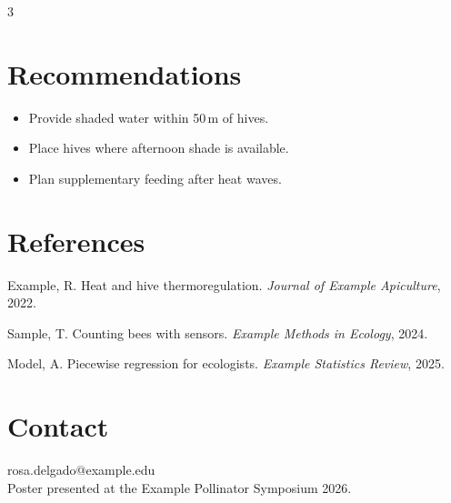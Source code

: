 \documentclass{article}
\newcommand{\smallsize}{\fontsize{29}{37}\selectfont}
\begin{document}
\begin{multicols}{3}
\section{Recommendations}
\begin{itemize}
  \item Provide shaded water within 50\,m of hives.
  \item Place hives where afternoon shade is available.
  \item Plan supplementary feeding after heat waves.
\end{itemize}

\section{References}
{\smallsize
\begin{enumerate}[label={[\arabic*]}]
  \item Example, R. Heat and hive thermoregulation. \emph{Journal of Example Apiculture}, 2022.
  \item Sample, T. Counting bees with sensors. \emph{Example Methods in Ecology}, 2024.
  \item Model, A. Piecewise regression for ecologists. \emph{Example Statistics Review}, 2025.
\end{enumerate}
\par}

\section{Contact}
rosa.delgado@example.edu\\
Poster presented at the Example Pollinator Symposium 2026.

\end{multicols}
\end{document}
